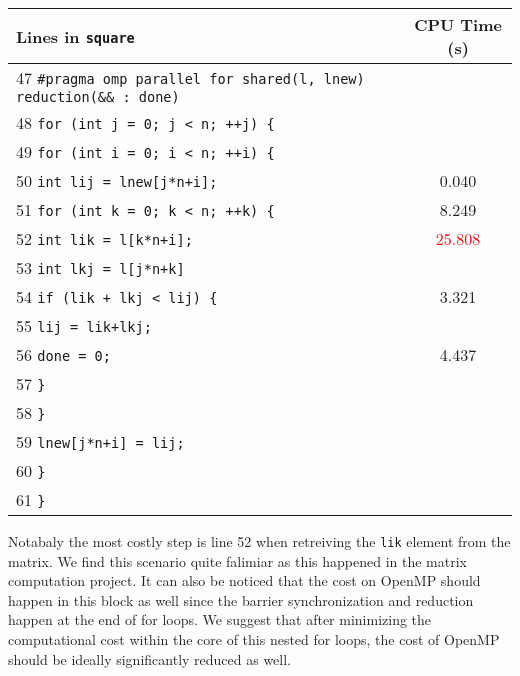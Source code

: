 \documentclass[12pt]{article}
\begin{document}
\bigskip
\begin{center}
	\begin{tabular}{l|c}
		Lines in \texttt{square} & CPU Time (s) \\ \hline
		47 \texttt{\#pragma omp parallel for shared(l, lnew) reduction(\&\& : done)} &  \\
		48 \texttt{for (int j = 0; j < n; ++j) \{} & \\       
		49 \hspace{8 mm} \texttt{for (int i = 0; i < n; ++i) \{} &  \\  
        50 \hspace{16 mm} \texttt{int lij = lnew[j*n+i];} & 0.040 \\  
        51 \hspace{16 mm} \texttt{for (int k = 0; k < n; ++k) \{} & 8.249 \\  
        52 \hspace{24 mm} \texttt{int lik = l[k*n+i];} & \textcolor{red}{25.808} \\  
        53 \hspace{24 mm} \texttt{int lkj = l[j*n+k]} &  \\  
        54 \hspace{24 mm} \texttt{if (lik + lkj < lij) \{} & 3.321 \\  
        55 \hspace{32 mm} \texttt{lij = lik+lkj;} &  \\  
        56 \hspace{32 mm} \texttt{done = 0;} & 4.437 \\  
        57 \hspace{24 mm} \texttt{\}} &  \\  
        58 \hspace{16 mm} \texttt{\}} & \\  
        59 \hspace{16 mm} \texttt{lnew[j*n+i] = lij;} &  \\  
        60 \hspace{8 mm} \texttt{\}} &  \\  
        61 \texttt{\}} &  \\  
	\end{tabular}
\end{center}

\bigskip
Notabaly the most costly step is line 52 when retreiving the \texttt{lik} element from the matrix. We find this scenario quite falimiar as this happened in the matrix computation project. It can also be noticed that the cost on OpenMP should happen in this block as well since the barrier synchronization and reduction happen at the end of for loops. We suggest that after minimizing the computational cost within the core of this nested for loops, the cost of OpenMP should be ideally significantly reduced as well. \\
\end{document}
